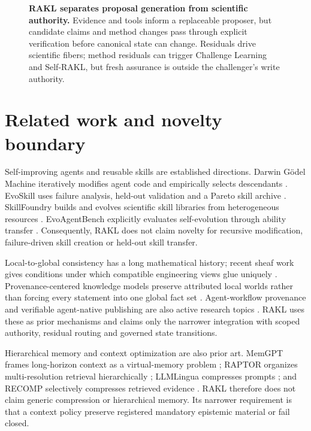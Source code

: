 \documentclass[11pt]{article}
\newcommand{\RAKL}{\textsc{RAKL}}
\begin{document}
\begin{figure}[t]
{}
\caption{\textbf{RAKL separates proposal generation from scientific authority.} Evidence and tools inform a replaceable proposer, but candidate claims and method changes pass through explicit verification before canonical state can change. Residuals drive scientific fibers; method residuals can trigger Challenge Learning and Self-RAKL, but fresh assurance is outside the challenger's write authority.}
\label{fig:architecture}
\end{figure}

\section{Related work and novelty boundary}
Self-improving agents and reusable skills are established directions. Darwin G\"odel Machine iteratively modifies agent code and empirically selects descendants \cite{zhang2025}. EvoSkill uses failure analysis, held-out validation and a Pareto skill archive \cite{alzubi2026}. SkillFoundry builds and evolves scientific skill libraries from heterogeneous resources \cite{shen2026}. EvoAgentBench explicitly evaluates self-evolution through ability transfer \cite{gao2026}. Consequently, \RAKL{} does not claim novelty for recursive modification, failure-driven skill creation or held-out skill transfer.

Local-to-global consistency has a long mathematical history; recent sheaf work gives conditions under which compatible engineering views glue uniquely \cite{gibson2026}. Provenance-centered knowledge models preserve attributed local worlds rather than forcing every statement into one global fact set \cite{vitali2026}. Agent-workflow provenance and verifiable agent-native publishing are also active research topics \cite{souza2025,dogah2026}. \RAKL{} uses these as prior mechanisms and claims only the narrower integration with scoped authority, residual routing and governed state transitions.

Hierarchical memory and context optimization are also prior art. MemGPT frames long-horizon context as a virtual-memory problem \cite{packer2023}; RAPTOR organizes multi-resolution retrieval hierarchically \cite{sarthi2024}; LLMLingua compresses prompts \cite{jiang2023}; and RECOMP selectively compresses retrieved evidence \cite{xu2023}. \RAKL{} therefore does not claim generic compression or hierarchical memory. Its narrower requirement is that a context policy preserve registered mandatory epistemic material or fail closed.
\end{document}
